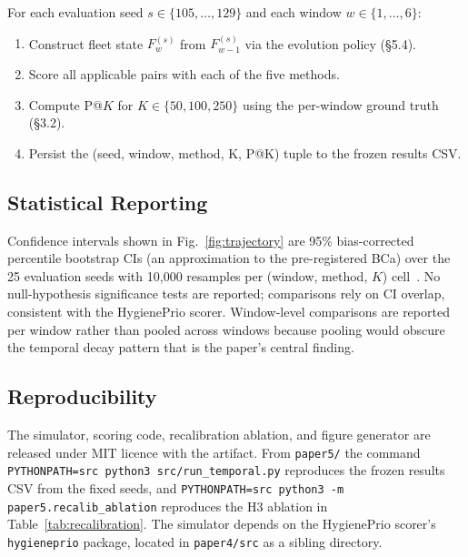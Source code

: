 For each evaluation seed $s \in \{105, \ldots, 129\}$ and each window $w \in \{1, \ldots, 6\}$:
\begin{enumerate}
\item Construct fleet state $F_w^{(s)}$ from $F_{w-1}^{(s)}$ via the evolution policy (\S5.4).
\item Score all applicable pairs with each of the five methods.
\item Compute P@$K$ for $K \in \{50, 100, 250\}$ using the per-window ground truth (\S3.2).
\item Persist the (seed, window, method, K, P@K) tuple to the frozen results CSV.
\end{enumerate}

\subsection{Statistical Reporting}

Confidence intervals shown in Fig.~\ref{fig:trajectory} are 95\% bias-corrected percentile bootstrap CIs (an approximation to the pre-registered BCa) over the 25 evaluation seeds with 10{,}000 resamples per (window, method, $K$) cell~\cite{efron1994introduction}. No null-hypothesis significance tests are reported; comparisons rely on CI overlap, consistent with the HygienePrio scorer. Window-level comparisons are reported per window rather than pooled across windows because pooling would obscure the temporal decay pattern that is the paper's central finding.

\subsection{Reproducibility}

The simulator, scoring code, recalibration ablation, and figure generator are released under MIT licence with the artifact. From \texttt{paper5/} the command \texttt{PYTHONPATH=src python3 src/\allowbreak run\_temporal.py} reproduces the frozen results CSV from the fixed seeds, and \texttt{PYTHONPATH=src python3 -m paper5.recalib\_ablation} reproduces the H3 ablation in Table~\ref{tab:recalibration}. The simulator depends on the HygienePrio scorer's \texttt{hygieneprio} package, located in \texttt{paper4/src} as a sibling directory.
